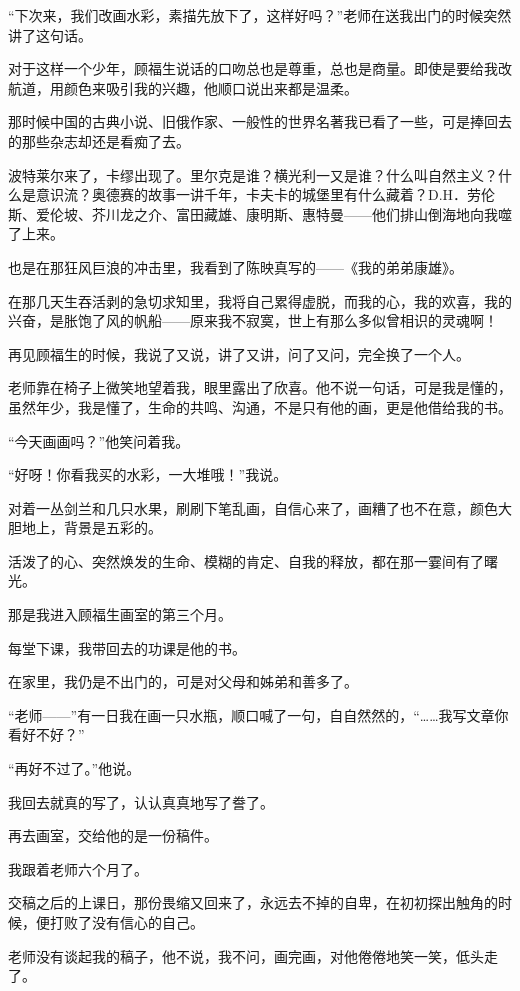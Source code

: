 \par “下次来，我们改画水彩，素描先放下了，这样好吗？”老师在送我出门的时候突然讲了这句话。
\par 对于这样一个少年，顾福生说话的口吻总也是尊重，总也是商量。即使是要给我改航道，用颜色来吸引我的兴趣，他顺口说出来都是温柔。
\par 那时候中国的古典小说、旧俄作家、一般性的世界名著我已看了一些，可是捧回去的那些杂志却还是看痴了去。
\par 波特莱尔来了，卡缪出现了。里尔克是谁？横光利一又是谁？什么叫自然主义？什么是意识流？奥德赛的故事一讲千年，卡夫卡的城堡里有什么藏着？D.H．劳伦斯、爱伦坡、芥川龙之介、富田藏雄、康明斯、惠特曼——他们排山倒海地向我噬了上来。
\par 也是在那狂风巨浪的冲击里，我看到了陈映真写的——《我的弟弟康雄》。
\par 在那几天生吞活剥的急切求知里，我将自己累得虚脱，而我的心，我的欢喜，我的兴奋，是胀饱了风的帆船——原来我不寂寞，世上有那么多似曾相识的灵魂啊！
\par 再见顾福生的时候，我说了又说，讲了又讲，问了又问，完全换了一个人。
\par 老师靠在椅子上微笑地望着我，眼里露出了欣喜。他不说一句话，可是我是懂的，虽然年少，我是懂了，生命的共鸣、沟通，不是只有他的画，更是他借给我的书。
\par “今天画画吗？”他笑问着我。
\par “好呀！你看我买的水彩，一大堆哦！”我说。
\par 对着一丛剑兰和几只水果，刷刷下笔乱画，自信心来了，画糟了也不在意，颜色大胆地上，背景是五彩的。
\par 活泼了的心、突然焕发的生命、模糊的肯定、自我的释放，都在那一霎间有了曙光。
\par 那是我进入顾福生画室的第三个月。
\par 每堂下课，我带回去的功课是他的书。
\par 在家里，我仍是不出门的，可是对父母和姊弟和善多了。
\par “老师——”有一日我在画一只水瓶，顺口喊了一句，自自然然的，“……我写文章你看好不好？”
\par “再好不过了。”他说。
\par 我回去就真的写了，认认真真地写了誊了。
\par 再去画室，交给他的是一份稿件。
\par 我跟着老师六个月了。
\par 交稿之后的上课日，那份畏缩又回来了，永远去不掉的自卑，在初初探出触角的时候，便打败了没有信心的自己。
\par 老师没有谈起我的稿子，他不说，我不问，画完画，对他倦倦地笑一笑，低头走了。
